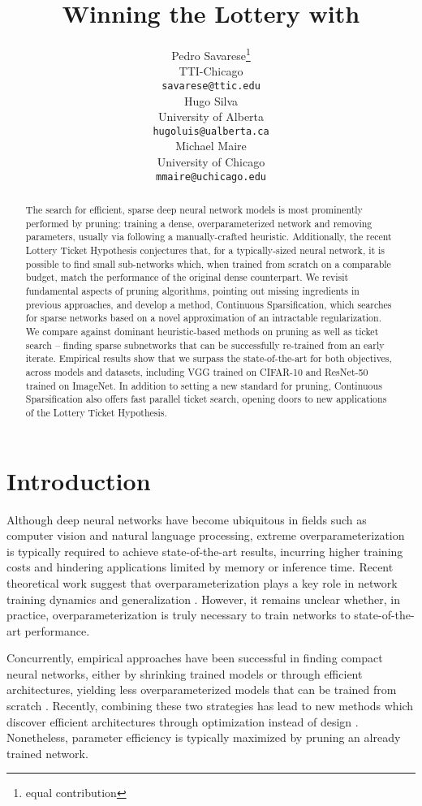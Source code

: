 \documentclass{article}
\title{Winning the Lottery with \method}
\author{Pedro Savarese\thanks{equal contribution} \\
    TTI-Chicago \\
    \texttt{savarese@ttic.edu} \\
    \And
    Hugo Silva\printfnsymbol{1} \\
    University of Alberta \\
    \texttt{hugoluis@ualberta.ca} \\
    \And
    Michael Maire \\
    University of Chicago \\
    \texttt{mmaire@uchicago.edu} \\
}
\newcommand{\citep}[1]{\cite{#1}}
\begin{document}
\raggedbottom

\maketitle

\begin{abstract}
The search for efficient, sparse deep neural network models is most prominently performed by pruning: training a dense, overparameterized network and removing parameters, usually via following a manually-crafted heuristic. Additionally, the recent Lottery Ticket Hypothesis conjectures that, for a typically-sized neural network, it is possible to find small sub-networks which, when trained from scratch on a comparable budget, match the performance of the original dense counterpart. We revisit fundamental aspects of pruning algorithms, pointing out missing ingredients in previous approaches, and develop a method, Continuous Sparsification, which searches for sparse networks based on a novel approximation of an intractable  regularization. We compare against dominant heuristic-based methods on pruning as well as ticket search -- finding sparse subnetworks that can be successfully re-trained from an early iterate. Empirical results show that we surpass the state-of-the-art for both objectives, across models and datasets, including VGG trained on CIFAR-10 and ResNet-50 trained on ImageNet. In addition to setting a new standard for pruning, Continuous Sparsification also offers fast parallel ticket search, opening doors to new applications of the Lottery Ticket Hypothesis.
\end{abstract}

\section{Introduction}

Although deep neural networks have become ubiquitous in fields such as computer vision and natural language processing, extreme overparameterization is typically required to achieve state-of-the-art results, incurring higher training costs and hindering applications limited by memory or inference time. Recent theoretical work suggest that overparameterization plays a key role in network training dynamics \citep{overparamtraining} and generalization \citep{roleofoverparam}. However, it remains unclear whether, in practice, overparameterization is truly necessary to train networks to state-of-the-art performance.

Concurrently, empirical approaches have been successful in finding compact neural networks, either by shrinking trained models \citep{magnitudepruning, gmp, deepcompress} or through efficient architectures, yielding less overparameterized models that can be trained from scratch \citep{squeezenet}. Recently, combining these two strategies has lead to new methods which discover efficient architectures through optimization instead of design \citep{darts,implicitrecurrent}. Nonetheless, parameter efficiency is typically maximized by pruning an already trained network.
\end{document}
